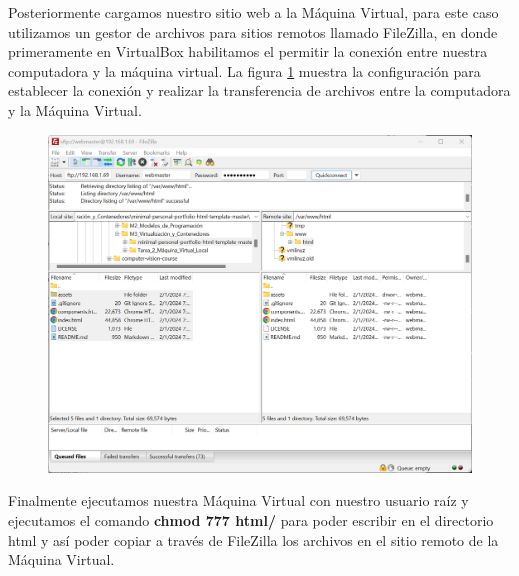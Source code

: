 \documentclass[12pt,a4paper]{article}
\begin{document}
\begin{itemize}
Posteriormente cargamos nuestro sitio web a la Máquina Virtual, para este caso utilizamos un gestor de archivos para sitios remotos llamado FileZilla, en donde primeramente en VirtualBox habilitamos el permitir la conexión entre nuestra computadora y la máquina virtual. La figura \ref{fig:Cargado_sitio_web_1} muestra la configuración para establecer la conexión y realizar la transferencia de archivos entre la computadora y la Máquina Virtual.

\begin{figure}[H]
    \centering
    \includegraphics[width=1\linewidth]{M3_Virtualización_y_Contenedores/Tarea_2_Máquina_Virtual_Local/reporte/figuras/6-1_Carga_Sitio_Web_en_MV.png}
    \label{fig:Cargado_sitio_web_1}
\end{figure}

Finalmente ejecutamos nuestra Máquina Virtual con nuestro usuario raíz y ejecutamos el comando \textbf{chmod 777 html/} para poder escribir en el directorio html y así poder copiar a través de FileZilla los archivos en el sitio remoto de la Máquina Virtual.


\end{itemize}
\end{document}
